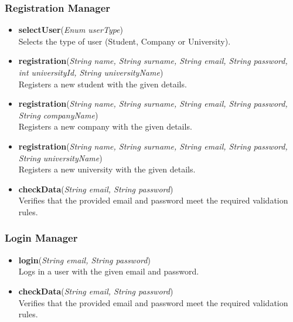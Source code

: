 \subsubsection*{Registration Manager}
\begin{itemize}

    \item \textbf{selectUser}(\textit{Enum userType}) \\
    Selects the type of user (Student, Company or University).

    \item \textbf{registration}(\textit{String name, String surname, String email, String password, int universityId, String universityName}) \\
    Registers a new student with the given details.

    \item \textbf{registration}(\textit{String name, String surname, String email, String password, String companyName}) \\
    Registers a new company with the given details.

    \item \textbf{registration}(\textit{String name, String surname, String email, String password, String universityName}) \\
    Registers a new university with the given details.

    \item \textbf{checkData}(\textit{String email, String password}) \\
    Verifies that the provided email and password meet the required validation rules.

\end{itemize}

\subsubsection*{Login Manager}
\begin{itemize}

    \item \textbf{login}(\textit{String email, String password}) \\
    Logs in a user with the given email and password.

    \item \textbf{checkData}(\textit{String email, String password}) \\
    Verifies that the provided email and password meet the required validation rules.

\end{itemize}

